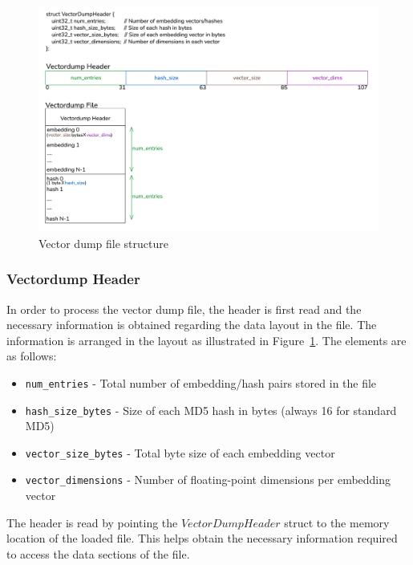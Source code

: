    \begin{figure}[H]
    \centering
    \includegraphics[width=1.0\linewidth]{images/VectorDumpFiles.png}
    \caption{Vector dump file structure}
    \label{fig:vectordumpfilestructure}
\end{figure}

\subsubsection{Vectordump Header}
\label{subsec:AppDesignModules-Vectordump_Header}
In order to process the vector dump file, the header is first read and the necessary information is obtained regarding the data layout in the file. The information is arranged in the layout as illustrated in Figure~\ref{fig:vectordumpfilestructure}. The elements are as follows:
\begin{itemize}
    \item \texttt{num\_entries} - Total number of embedding/hash pairs stored in the file
    \item \texttt{hash\_size\_bytes} - Size of each MD5 hash in bytes (always 16 for standard MD5)
    \item \texttt{vector\_size\_bytes} - Total byte size of each embedding vector
    \item \texttt{vector\_dimensions} - Number of floating-point dimensions per embedding vector
\end{itemize}

The header is read by pointing the $VectorDumpHeader$ struct to the memory location of the loaded file. This helps obtain the  necessary information required to access the data sections of the file.

